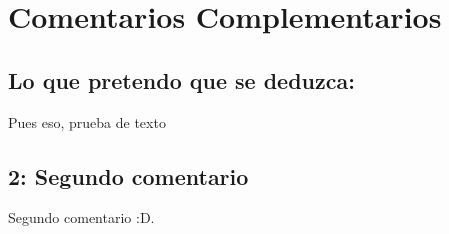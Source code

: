 \chapter[Ordenados por referencias, no por aparición]{Comentarios Complementarios}

\section {Lo que pretendo que se deduzca:}


Pues eso, prueba de texto

\newpage

\section {2: Segundo comentario}

Segundo comentario :D.

\newpage